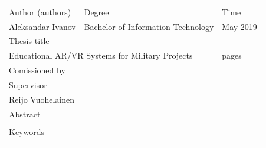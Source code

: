 \documentclass[12pt, a4paper,oneside, nocenter]{thesis}
\newcommand\blankpage{%
    \null
    \thispagestyle{empty}%
    \addtocounter{page}{-1}%
    \newpage}
\begin{document}
    \thispagestyle{empty}
    \noindent
    \begin{tabularx}{\linewidth}{|XXXX|}
      \hline
	   Author (authors) &  Degree &  & Time \\
	   Aleksandar Ivanov &  \multicolumn{2}{l}{Bachelor of Information Technology} & May 2019 \\
	   \hline
	   Thesis title & & & \\
	   \multicolumn{3}{|l}{Educational AR/VR Systems for Military Projects} & \pageref{LastPage} pages\\
	  \hline
	  Comissioned by & & & \\
	  \hline
	  Supervisor & & & \\
	  Reijo Vuohelainen & & & \\
	  \hline
	  Abstract & & & \\
	  & & & \\
	  \hline
	  Keywords & & & \\
	  & & & \\
	  \hline
    \end{tabularx}

\newpage%
{
\tableofcontents
}

\newpage%



\end{document}
